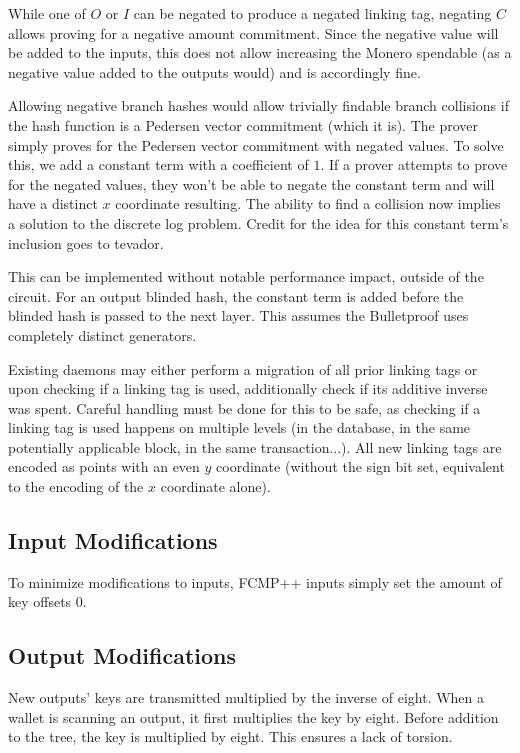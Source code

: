 \documentclass[]{article}
\begin{document}
While one of $O$ or $I$ can be negated to produce a negated linking tag, negating $C$ allows proving for a negative amount commitment. Since the negative value will be added to the inputs, this does not allow increasing the Monero spendable (as a negative value added to the outputs would) and is accordingly fine.

Allowing negative branch hashes would allow trivially findable branch collisions if the hash function is a Pedersen vector commitment (which it is). The prover simply proves for the Pedersen vector commitment with negated values. To solve this, we add a constant term with a coefficient of $1$. If a prover attempts to prove for the negated values, they won't be able to negate the constant term and will have a distinct $x$ coordinate resulting. The ability to find a collision now implies a solution to the discrete log problem. Credit for the idea for this constant term's inclusion goes to tevador.

This can be implemented without notable performance impact, outside of the circuit. For an output blinded hash, the constant term is added before the blinded hash is passed to the next layer. This assumes the Bulletproof uses completely distinct generators.

Existing daemons may either perform a migration of all prior linking tags or upon checking if a linking tag is used, additionally check if its additive inverse was spent. Careful handling must be done for this to be safe, as checking if a linking tag is used happens on multiple levels (in the database, in the same potentially applicable block, in the same transaction...). All new linking tags are encoded as points with an even $y$ coordinate (without the sign bit set, equivalent to the encoding of the $x$ coordinate alone).

\subsection{Input Modifications}

To minimize modifications to inputs, FCMP++ inputs simply set the amount of key offsets 0.

\subsection{Output Modifications}

New outputs' keys are transmitted multiplied by the inverse of eight. When a wallet is scanning an output, it first multiplies the key by eight. Before addition to the tree, the key is multiplied by eight. This ensures a lack of torsion.
\end{document}
